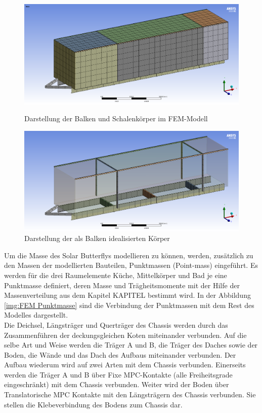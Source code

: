 \begin{figure}[h]
  \centering
  \begin{minipage}{.5\textwidth}
    \centering
    \includegraphics[width=.98\linewidth]{04_figures/FEM Mesh1.png}
    \caption{Darstellung der Balken und Schalenkörper im FEM-Modell}
    \label{FEM Mesh1}
  \end{minipage}%
  \begin{minipage}{.5\textwidth}
    \centering
    \includegraphics[width=.98\linewidth]{04_figures/FEM Mesh3.png}
    \caption{Darstellung der als Balken idealisierten Körper}
    \label{FEM Mesh3}
  \end{minipage}
\end{figure}

Um die Masse des Solar Butterflys modellieren zu können, werden, zusätzlich zu den Massen der modellierten Bauteilen, Punktmassen (Point-mass) eingeführt. Es werden für die drei Raumelemente Küche, Mittelkörper und Bad je eine Punktmasse definiert, deren Masse und Trägheitsmomente mit der Hilfe der Massenverteilung aus dem Kapitel KAPITEL bestimmt wird. In der Abbildung \ref{img:FEM Punktmasse} sind die Verbindung der Punktmassen mit dem Rest des Modelles dargestellt.\\
Die Deichsel, Längsträger und Querträger des Chassis werden durch das Zusammenführen der deckungsgleichen Koten miteinander verbunden. Auf die selbe Art und Weise werden die Träger A und B, die Träger des Daches sowie der Boden, die Wände und das Dach des Aufbaus miteinander verbunden. Der Aufbau wiederum wird auf zwei Arten mit dem Chassis verbunden. Einerseits werden die Träger A und B über Fixe MPC-Kontakte (alle Freiheitsgrade eingeschränkt) mit dem Chassis verbunden. Weiter wird der Boden über Translatorische MPC Kontakte mit den Längsträgern des Chassis verbunden. Sie stellen die Klebeverbindung des Bodens zum Chassis dar.



